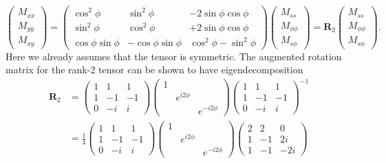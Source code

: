 \[\begin{pmatrix} M_{xx} \\ M_{yy} \\ M_{xy} \end{pmatrix} = 
\begin{pmatrix}
    \cos^2\phi & \sin^2\phi & -2\sin\phi\cos\phi \\
    \sin^2\phi & \cos^2\phi & +2\sin\phi\cos\phi \\
    \cos\phi \sin\phi & -\cos\phi \sin\phi & \cos^2\phi - \sin^2\phi
\end{pmatrix}
\begin{pmatrix} M_{ss} \\ M_{\phi\phi} \\ M_{s\phi} \end{pmatrix} 
= \mathbf{R}_2 \begin{pmatrix} M_{ss} \\ M_{\phi\phi} \\ M_{s\phi} \end{pmatrix}.
\]
Here we already assumes that the tensor is symmetric. The augmented rotation matrix for the rank-2 tensor can be shown to have eigendecomposition
\[\begin{aligned}
    \mathbf{R}_2 &=
    \begin{pmatrix}
        1 & 1 & 1\\
        1 & -1 & -1\\
        0 & -i & i
    \end{pmatrix}
    \begin{pmatrix} 1 & & \\ & e^{i2\phi} & \\ & & e^{-i2\phi} \end{pmatrix}
    \begin{pmatrix}
        1 & 1 & 1\\
        1 & -1 & -1\\
        0 & -i & i
    \end{pmatrix}^{-1} \\ 
    &= \frac{1}{4} \begin{pmatrix}
        1 & 1 & 1\\
        1 & -1 & -1\\
        0 & -i & i
    \end{pmatrix}
    \begin{pmatrix} 1 & & \\ & e^{i2\phi} & \\ & & e^{-i2\phi} \end{pmatrix}
    \begin{pmatrix}
        2 & 2 & 0\\
        1 & -1 & 2i\\
        1 & -1 & -2i
    \end{pmatrix}
\end{aligned}\]
